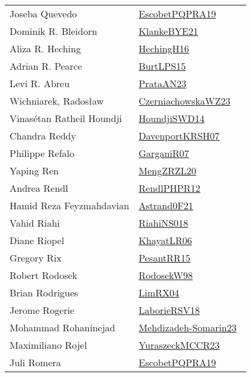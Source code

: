 {\begin{longtable}{p{4cm}p{20cm}}
Joseba Quevedo & \href{articles/EscobetPQPRA19.pdf}{EscobetPQPRA19}~\cite{EscobetPQPRA19}\\
Dominik R. Bleidorn & \href{papers/KlankeBYE21.pdf}{KlankeBYE21}~\cite{KlankeBYE21}\\
Aliza R. Heching & \href{papers/HechingH16.pdf}{HechingH16}~\cite{HechingH16}\\
Adrian R. Pearce & \href{papers/BurtLPS15.pdf}{BurtLPS15}~\cite{BurtLPS15}\\
Levi R. Abreu & \href{articles/PrataAN23.pdf}{PrataAN23}~\cite{PrataAN23}\\
Wichniarek, Radosław & \href{articles/CzerniachowskaWZ23.pdf}{CzerniachowskaWZ23}~\cite{CzerniachowskaWZ23}\\
Vinas{\'{e}}tan Ratheil Houndji & \href{papers/HoundjiSWD14.pdf}{HoundjiSWD14}~\cite{HoundjiSWD14}\\
Chandra Reddy & \href{papers/DavenportKRSH07.pdf}{DavenportKRSH07}~\cite{DavenportKRSH07}\\
Philippe Refalo & \href{papers/GarganiR07.pdf}{GarganiR07}~\cite{GarganiR07}\\
Yaping Ren & \href{articles/MengZRZL20.pdf}{MengZRZL20}~\cite{MengZRZL20}\\
Andrea Rendl & \href{papers/RendlPHPR12.pdf}{RendlPHPR12}~\cite{RendlPHPR12}\\
Hamid Reza Feyzmahdavian & \href{papers/Astrand0F21.pdf}{Astrand0F21}~\cite{Astrand0F21}\\
Vahid Riahi & \href{papers/RiahiNS018.pdf}{RiahiNS018}~\cite{RiahiNS018}\\
Diane Riopel & \href{articles/KhayatLR06.pdf}{KhayatLR06}~\cite{KhayatLR06}\\
Gregory Rix & \href{papers/PesantRR15.pdf}{PesantRR15}~\cite{PesantRR15}\\
Robert Rodosek & \href{papers/RodosekW98.pdf}{RodosekW98}~\cite{RodosekW98}\\
Brian Rodrigues & \href{papers/LimRX04.pdf}{LimRX04}~\cite{LimRX04}\\
Jerome Rogerie & \href{articles/LaborieRSV18.pdf}{LaborieRSV18}~\cite{LaborieRSV18}\\
Mohammad Rohaninejad & \href{papers/Mehdizadeh-Somarin23.pdf}{Mehdizadeh-Somarin23}~\cite{Mehdizadeh-Somarin23}\\
Maximiliano Rojel & \href{articles/YuraszeckMCCR23.pdf}{YuraszeckMCCR23}~\cite{YuraszeckMCCR23}\\
Juli Romera & \href{articles/EscobetPQPRA19.pdf}{EscobetPQPRA19}~\cite{EscobetPQPRA19}\\

\end{longtable}}
